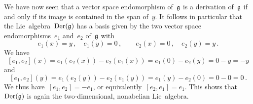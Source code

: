 \begin{example}
	We have now seen that a vector space endomorphism of~$\mathfrak{g}$ is a derivation of~$\mathfrak{g}$ if and only if its image is contained in the span of~$y$.
	It follows in particular that the Lie~algebra~$\operatorname{Der}(\mathfrak{g})$ has a basis given by the two vector space endomorphisms~$e_1$ and~$e_2$ of~$\mathfrak{g}$ with
	\[
		e_1(x) = y \,,
		\quad
		e_1(y) = 0 \,,
		\qquad
		e_2(x) = 0 \,,
		\quad
		e_2(y) = y \,.
	\]
	We have
	\[
		[e_1, e_2](x)
		=
		e_1( e_2(x) ) - e_2( e_1(x) )
		=
		e_1(0) - e_2(y)
		=
		0 - y
		=
		- y
	\]
	and
	\[
		[e_1, e_2](y)
		=
		e_1( e_2(y) ) - e_2( e_1(y) )
		=
		e_1( y ) - e_2 ( 0 )
		=
		0 - 0
		=
		0 \,.
	\]
	We thus have~$[e_1, e_2] = -e_1$, or equivalently~$[e_2, e_1] = e_1$.
	This shows that~$\operatorname{Der}(\mathfrak{g})$ is again the two-dimensional, nonabelian Lie~algebra.
\end{example}


